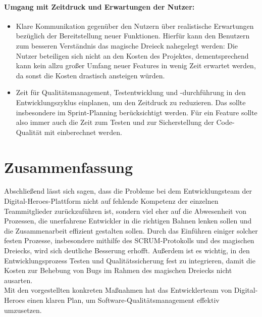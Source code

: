 \subsubsection*{Umgang mit Zeitdruck und Erwartungen der Nutzer:}

\begin{itemize}
	\item Klare Kommunikation gegenüber den Nutzern über realistische Erwartungen bezüglich der Bereitstellung neuer Funktionen.
	Hierfür kann den Benutzern zum besseren Verständnis das magische Dreieck nahegelegt werden: 
	Die Nutzer beteiligen sich nicht an den Kosten des Projektes, dementsprechend kann kein allzu großer Umfang neuer 
	Features in wenig Zeit erwartet werden, da sonst die Kosten drastisch ansteigen würden. 
	\item Zeit für Qualitätsmanagement, Testentwicklung und -durchführung in den Entwicklungszyklus einplanen, um den Zeitdruck zu reduzieren.
	Das sollte insbesondere im Sprint-Planning berücksichtigt werden. Für ein Feature sollte also immer auch die Zeit zum Testen 
	und zur Sicherstellung der Code-Qualität mit einberechnet werden. 
\end{itemize}

\chapter{Zusammenfassung}

Abschließend lässt sich sagen, dass die Probleme bei dem Entwicklungsteam der Digital-Heroes-Plattform 
nicht auf fehlende Kompetenz der einzelnen Teammitglieder zurückzuführen ist, 
sondern viel eher auf die Abwesenheit von Prozessen, die unerfahrene Entwickler in die richtigen Bahnen 
lenken sollen und die Zusammenarbeit effizient gestalten sollen. Durch das Einführen einiger 
solcher festen Prozesse, insbesondere mithilfe des SCRUM-Protokolls und des magischen Dreiecks, 
wird sich deutliche Besserung erhofft. Außerdem ist es wichtig, in den Entwicklungsprozess 
Testen und Qualitätssicherung fest zu integrieren, damit die Kosten zur Behebung von Bugs im Rahmen 
des magischen Dreiecks nicht ausarten. \\ 
Mit den vorgestellten konkreten Maßnahmen hat das Entwicklerteam von Digital-Heroes einen klaren Plan, 
um Software-Qualitätsmanagement effektiv umzusetzen.